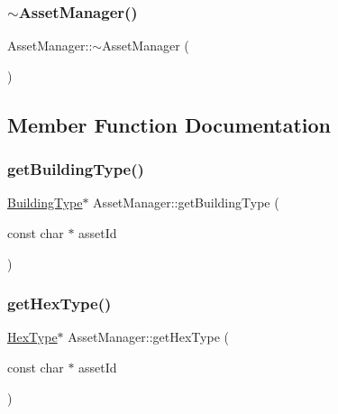 \mbox{\label{class_asset_manager_a9c89817cbf3516f1451c116e89f47d30}} 
\subsubsection{\texorpdfstring{$\sim$\+Asset\+Manager()}{~AssetManager()}}
{\footnotesize\ttfamily Asset\+Manager\+::$\sim$\+Asset\+Manager (\begin{DoxyParamCaption}{ }\end{DoxyParamCaption})\hspace{0.3cm}{\ttfamily [virtual]}}



\subsection{Member Function Documentation}
\mbox{\label{class_asset_manager_a38c5ac47c59edffad4bd370bcf139be7}} 
\subsubsection{\texorpdfstring{get\+Building\+Type()}{getBuildingType()}}
{\footnotesize\ttfamily \hyperlink{class_building_type}{Building\+Type}$\ast$ Asset\+Manager\+::get\+Building\+Type (\begin{DoxyParamCaption}\item[{const char $\ast$}]{asset\+Id }\end{DoxyParamCaption})\hspace{0.3cm}{\ttfamily [inline]}}

\mbox{\label{class_asset_manager_a187aaa04aaf845d21fff965a39096c89}} 
\subsubsection{\texorpdfstring{get\+Hex\+Type()}{getHexType()}}
{\footnotesize\ttfamily \hyperlink{class_hex_type}{Hex\+Type}$\ast$ Asset\+Manager\+::get\+Hex\+Type (\begin{DoxyParamCaption}\item[{const char $\ast$}]{asset\+Id }\end{DoxyParamCaption})\hspace{0.3cm}{\ttfamily [inline]}}

